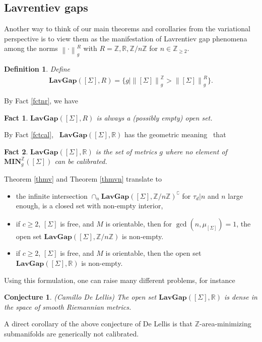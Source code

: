 \documentclass[11pt,a4paper]{amsart}
\numberwithin{equation}{section}
\newcommand{\mn}{\mathbf{MIN}}
\newcommand{\lag}{\mathbf{LavGap}}
\newcommand{\Si}{\Sigma}
\newcommand{\cp}{^\complement}
\newcommand{\no}[1]{\left\lVert#1\right\rVert}
\newcommand{\R}{\mathbb{R}}
\newcommand{\Z}{\mathbb{Z}}
\theoremstyle{plain}
\newtheorem{fact}{Fact}[subsection]
\newtheorem{defn}{Definition}[subsection]
\newtheorem{conj}{Conjecture}
\theoremstyle{definition}
\numberwithin{equation}{subsection}
\begin{document}
	\subsection{Lavrentiev gaps}
	Another way to think of our main theorems and corollaries from the variational perspective is to view them as the manifestation of Lavrentiev gap phenomena among the norms $\no{\cdot}_g^{R}$ with $R=\Z,\R,\Z/n\Z$ for $n\in \Z_{\ge 2}.$ 
	\begin{defn}\label{defnlavgap}
		Define 
		\begin{align}\label{lavgap}
			\lag([\Si],R)=\{g|\no{[\Si]}_{g}^{\Z}>\no{[\Si]}_g^{R}\}.
		\end{align}
	\end{defn}
	By Fact \ref{fctnr}, we have
	\begin{fact}
		$\lag([\Si],R)$ is always a (possibly empty) open set.  
	\end{fact}
	By Fact \ref{fctcal},  $\lag([\Si],\R)$ has the geometric meaning  that
	\begin{fact}
		$\lag([\Si],\R)$ is the set of metrics $g$ where no element of $\mn_{g}^{\Z}([\Si])$ can be calibrated.
	\end{fact}
	
	Theorem \ref{thmv} and Theorem \ref{thmvn} translate to\begin{itemize}
		\item the infinite intersection $\cap_{n}\lag([\Si],\Z/n\Z)\cp$ for $\tau_d|n$ and $n$ large enough, is a closed set with non-empty interior,
		\item if $c\ge 2$, $[\Si]$ is free, and $M$ is orientable, then for $\operatorname{gcd}\left(n,\mu_{[\Si]}\right)=1$, the open set $\lag([\Si],\Z/n\Z)$ is non-empty.
		\item if $c\ge 2$, $[\Si]$ is free, and $M$ is orientable, then the open set $\lag([\Si],\R)$ is non-empty.
	\end{itemize}
	Using this formulation, one can raise many different problems, for instance
	\begin{conj}
		(Camillo De Lellis) The open set $\lag([\Si],\R)$ is dense in the space of smooth Riemannian metrics.
	\end{conj}A direct corollary of the above conjecture of De Lellis is that $\Z$-area-minimizing submanifolds are generically not calibrated. 
\end{document}
